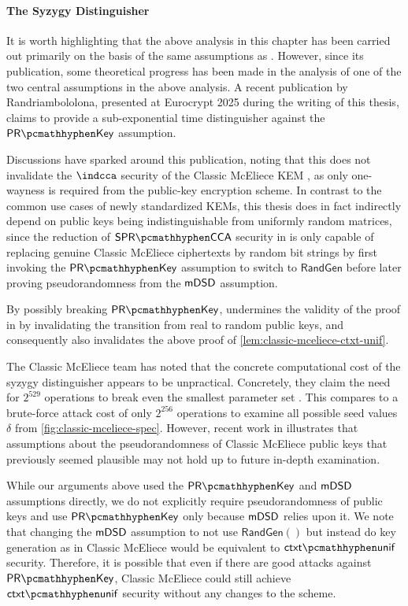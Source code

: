 \paragraph{The Syzygy Distinguisher}

It is worth highlighting that the above analysis in this chapter has been carried out primarily on the basis of the same assumptions as \cite{EC:Xagawa22}. However, since its publication, some theoretical progress has been made in the analysis of one of the two central assumptions in the above analysis. A recent publication by Randriambololona, presented at Eurocrypt 2025 during the writing of this thesis, \cite{cryptoeprint:2024/1193} claims to provide a sub-exponential time distinguisher against the $\prkey$ assumption.

Discussions have sparked around this publication, noting that this does not invalidate the $\indcca$ security of the Classic McEliece KEM \cite{mceliece-529-20250417}, as only one-wayness is required from the public-key encryption scheme.
In contrast to the common use cases of newly standardized KEMs, this thesis does in fact indirectly depend on public keys being indistinguishable from uniformly random matrices, since the reduction of $\sprcca$ security in \cite{EC:Xagawa22} is only capable of replacing genuine Classic McEliece ciphertexts by random bit strings by first invoking the $\prkey$ assumption to switch to $\mathsf{RandGen}$ before later proving pseudorandomness from the $\mathsf{mDSD}$ assumption.

By possibly breaking $\prkey$, \cite{cryptoeprint:2024/1193} undermines the validity of the proof in \cite{EC:Xagawa22} by invalidating the transition from real to random public keys, and consequently also invalidates the above proof of \cref{lem:classic-mceliece-ctxt-unif}.

The Classic McEliece team has noted that the concrete computational cost of the syzygy distinguisher appears to be unpractical. Concretely, they claim the need for $2^{529}$ operations to break even the smallest parameter set \cite{mceliece-529-20250417}. This compares to a brute-force attack cost of only $2^{256}$ operations to examine all possible seed values $\delta$ from \cref{fig:classic-mceliece-spec}.
However, recent work in \cite{cryptoeprint:2024/1193} illustrates that assumptions about the pseudorandomness of Classic McEliece public keys that previously seemed plausible may not hold up to future in-depth examination.

While our arguments above used the $\prkey$ and $\mathsf{mDSD}$ assumptions directly, we do not explicitly require pseudorandomness of public keys and use $\prkey$ only because $\mathsf{mDSD}$ relies upon it.
We note that changing the $\mathsf{mDSD}$ assumption to not use $\mathsf{RandGen}()$ but instead do key generation as in Classic McEliece would be equivalent to $\ctxtunif$ security.
Therefore, it is possible that even if there are good attacks against $\prkey$, Classic McEliece could still achieve $\ctxtunif$ security without any changes to the scheme.

